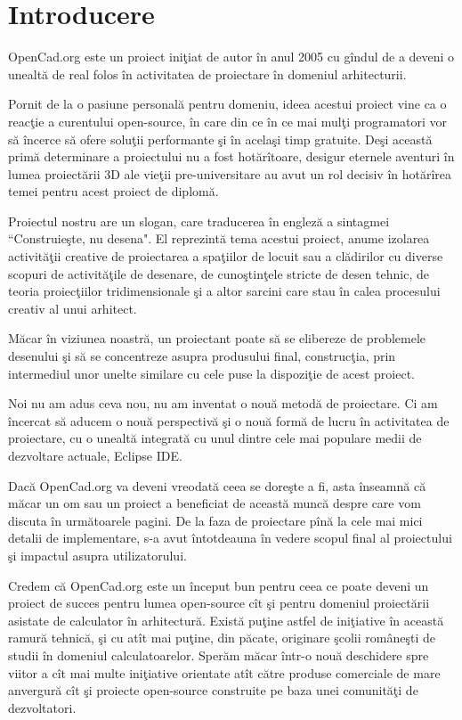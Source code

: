 \chapter{Introducere}

OpenCad.org este un proiect iniţiat de autor în anul 2005 cu gîndul de a deveni 
o unealtă de real folos în activitatea de proiectare în domeniul arhitecturii.

Pornit de la o pasiune personală pentru domeniu, ideea acestui proiect vine ca 
o reacţie a curentului open-source, în care din ce în ce mai mulţi programatori 
vor să încerce să ofere soluţii performante şi în acelaşi timp gratuite. Deşi 
această primă determinare a proiectului nu a fost hotărîtoare, desigur eternele 
aventuri în lumea proiectării 3D ale vieţii pre-universitare au avut un rol 
decisiv în hotărîrea temei pentru acest proiect de diplomă.

Proiectul nostru are un slogan, care traducerea în engleză a sintagmei 
``Construieşte, nu desena". El reprezintă tema acestui proiect, anume izolarea 
activităţii creative de proiectarea a spaţiilor de locuit sau a clădirilor cu 
diverse scopuri de activităţile de desenare, de cunoştinţele stricte de desen 
tehnic, de teoria proiecţiilor tridimensionale şi a altor sarcini care stau în 
calea procesului creativ al unui arhitect.

Măcar în viziunea noastră, un proiectant poate să se elibereze de problemele 
desenului şi să se concentreze asupra produsului final, construcţia, prin 
intermediul unor unelte similare cu cele puse la dispoziţie de acest proiect.

Noi nu am adus ceva nou, nu am inventat o nouă metodă de proiectare. Ci am 
încercat să aducem o nouă perspectivă şi o nouă formă de lucru în activitatea 
de proiectare, cu o unealtă integrată cu unul dintre cele mai populare medii de 
dezvoltare actuale, Eclipse IDE.

Dacă OpenCad.org va deveni vreodată ceea se doreşte a fi, asta înseamnă că 
măcar un om sau un proiect a beneficiat de această muncă despre care vom 
discuta în următoarele pagini. De la faza de proiectare pînă la cele mai mici 
detalii de implementare, s-a avut întotdeauna în vedere scopul final al 
proiectului şi impactul asupra utilizatorului.

Credem că OpenCad.org este un început bun pentru ceea ce poate deveni un 
proiect de succes pentru lumea open-source cît şi pentru domeniul proiectării 
asistate de calculator în arhitectură. Există puţine astfel de iniţiative în 
această ramură tehnică, şi cu atît mai puţine, din păcate, originare şcolii 
româneşti de studii în domeniul calculatoarelor. Sperăm măcar într-o nouă 
deschidere spre viitor a cît mai multe iniţiative orientate atît către produse 
comerciale de mare anvergură cît şi proiecte open-source construite pe baza 
unei comunităţi de dezvoltatori.

